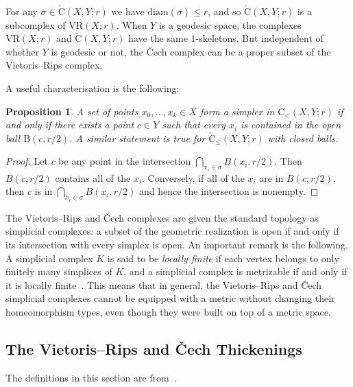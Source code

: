 \documentclass{amsart}
\theoremstyle{plain}
\newtheorem{proposition}[lemma]{Proposition}
\theoremstyle{definition}
\theoremstyle{myremark}
\newcommand{\diam}{\mathrm{diam}}
\newcommand{\ball}[2]{\mathrm{B}(#1,#2)}
\newcommand{\vr}[2]{\mathrm{VR}(#1;#2)}
\newcommand{\cecha}[3]{\mathrm{\check{C}}(#1,#2;#3)}
\newcommand{\cechaleq}[3]{\mathrm{\check{C}_{\le}}(#1,#2;#3)}
\newcommand{\cechaless}[3]{\mathrm{\check{C}_{<}}(#1,#2;#3)}
\begin{document}
For any $\sigma\in\cecha{X}{Y}{r}$ we have $\diam(\sigma) \le r$, and so $\cecha{X}{Y}{r}$ is a subcomplex of $\vr{X}{r}$.
When $Y$ is a geodesic space, the complexes $\vr{X}{r}$ and $\cecha{X}{Y}{r}$ have the same $1$-skeletons.
But independent of whether $Y$ is geodesic or not, the \v{C}ech complex can be a proper subset of the Vietoris--Rips complex.

A useful characterisation is the following:
\begin{proposition}\label{prop:cech-ball}
A set of points $x_0 , \ldots , x_k\in X$ form a simplex in $\cechaless{X}{Y}{r}$ if and only if there exists a point $c\in Y$ such that every $x_i$ is contained in the open ball $\ball{c}{r/2}$. A similar statement is true for $\cechaleq{X}{Y}{r}$ with closed balls.
\end{proposition}

\begin{proof}
Let $c$ be any point in the intersection $\bigcap_{x_i \in \sigma} B(x_i,r/2)$.
Then $B(c,r/2)$ contains all of the $x_i$.
Conversely, if all of the $x_i$ are in $B(c,r/2)$, then $c$ is in $\bigcap_{x_i \in \sigma} B(x_i,r/2)$ and hence the intersection is nonempty.
\end{proof}

The Vietoris--Rips and \v{C}ech complexes are given the standard topology as simplicial complexes: a subset of the geometric realization is open if and only if its intersection with every simplex is open.
An important remark is the following. 
A simplicial complex $K$ is said to be \emph{locally finite} if each vertex belongs to only finitely many simplices of $K$, and a simplicial complex is metrizable if and only if it is locally finite~\cite[Proposition~4.2.16(2)]{sakai2013geometric}. This means that in general, the Vietoris--Rips and \v{C}ech simplicial complexes cannot be equipped with a metric without changing their homeomorphism types, even though they were built on top of a metric space.

\subsection{The Vietoris--Rips and \v{C}ech Thickenings}

The definitions in this section are from~\cite{MetricReconstructionViaOptimalTransport,edwards2011kantorovich,kellerer1982duality}.
 
\end{document}
